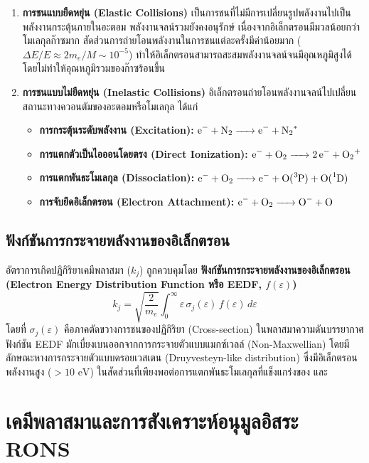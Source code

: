 \begin{enumerate}
    \item \textbf{การชนแบบยืดหยุ่น (Elastic Collisions)} เป็นการชนที่ไม่มีการเปลี่ยนรูปพลังงานไปเป็นพลังงานกระตุ้นภายในอะตอม พลังงานจลน์รวมยังคงอนุรักษ์ เนื่องจากอิเล็กตรอนมีมวลน้อยกว่าโมเลกุลก๊าซมาก สัดส่วนการถ่ายโอนพลังงานในการชนแต่ละครั้งมีค่าน้อยมาก ($\Delta E / E \approx 2 m_e / M \sim 10^{-5}$) ทำให้อิเล็กตรอนสามารถสะสมพลังงานจลน์จนมีอุณหภูมิสูงได้โดยไม่ทำให้อุณหภูมิรวมของก๊าซร้อนขึ้น
    \item \textbf{การชนแบบไม่ยืดหยุ่น (Inelastic Collisions)} อิเล็กตรอนถ่ายโอนพลังงานจลน์ไปเปลี่ยนสถานะทางควอนตัมของอะตอมหรือโมเลกุล ได้แก่
    \begin{itemize}
        \item \textbf{การกระตุ้นระดับพลังงาน (Excitation):} $\ce{e^- + N2 -> e^- + N2^*}$
        \item \textbf{การแตกตัวเป็นไอออนโดยตรง (Direct Ionization):} $\ce{e^- + O2 -> 2e^- + O2^+}$
        \item \textbf{การแตกพันธะโมเลกุล (Dissociation):} $\ce{e^- + O2 -> e^- + O(^3P) + O(^1D)}$
        \item \textbf{การจับยึดอิเล็กตรอน (Electron Attachment):} $\ce{e^- + O2 -> O^- + O}$
    \end{itemize}
\end{enumerate}

\subsection{ฟังก์ชันการกระจายพลังงานของอิเล็กตรอน}

อัตราการเกิดปฏิกิริยาเคมีพลาสมา ($k_j$) ถูกควบคุมโดย \textbf{ฟังก์ชันการกระจายพลังงานของอิเล็กตรอน (Electron Energy Distribution Function หรือ EEDF, $f(\varepsilon)$)}
\begin{equation}
    k_j = \sqrt{\frac{2}{m_e}} \int_0^\infty \varepsilon \, \sigma_j(\varepsilon) \, f(\varepsilon) \, d\varepsilon
\end{equation}
โดยที่ $\sigma_j(\varepsilon)$ คือภาคตัดขวางการชนของปฏิกิริยา (Cross-section) ในพลาสมาความดันบรรยากาศ ฟังก์ชัน EEDF มักเบี่ยงเบนออกจากการกระจายตัวแบบแมกซ์เวลล์ (Non-Maxwellian) โดยมีลักษณะหางการกระจายตัวแบบดรอยเวสเตน (Druyvesteyn-like distribution) ซึ่งมีอิเล็กตรอนพลังงานสูง ($> 10\text{ eV}$) ในสัดส่วนที่เพียงพอต่อการแตกพันธะโมเลกุลที่แข็งแกร่งของ  และ 

\section{เคมีพลาสมาและการสังเคราะห์อนุมูลอิสระ RONS}

